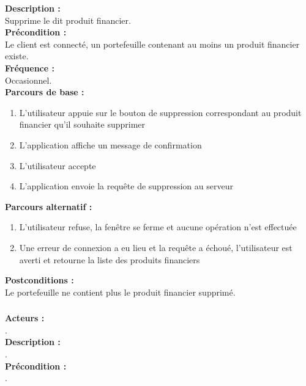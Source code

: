 \documentclass[../rapport.tex]{subfiles}
\begin{document}
\textbf{Description :} \\
Supprime le dit produit financier. \\

\textbf{Précondition :} \\
Le client est connecté, un portefeuille contenant au moins un produit financier existe. \\

\textbf{Fréquence :} \\
Occasionnel. \\

\textbf{Parcours de base :} \\
\begin{enumerate}
    \item L’utilisateur appuie sur le bouton de suppression correspondant au produit financier qu’il souhaite supprimer
    \item L’application affiche un message de confirmation
    \item L’utilisateur accepte
    \item L’application envoie la requête de suppression au serveur
\end{enumerate}
\bigskip

\textbf{Parcours alternatif :}
\begin{enumerate}
    \item L'utilisateur refuse, la fenêtre se ferme et aucune opération n'est effectuée
    \item Une erreur de connexion a eu lieu et la requête a échoué, l'utilisateur est averti et retourne la liste des produits financiers
\end{enumerate}

\textbf{Postconditions :} \\
Le portefeuille ne contient plus le produit financier supprimé. \\



\subsubsection{}

\textbf{Acteurs :} \\
. \\

\textbf{Description :} \\
. \\

\textbf{Précondition :} \\
. \\
\end{document}
